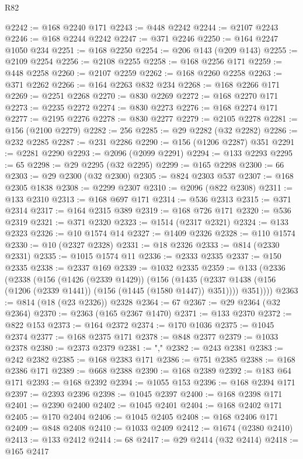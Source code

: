 \begin{lexlean}{R82}
\begin{coremodule}
@2242 := @168 @2240 @171
@2243 := @448 @2242
@2244 := @2107 @2243
@2246 := @168 @2244 @2242
@2247 := @371 @2246
@2250 := @164 @2247 @1050 @234
@2251 := @168 @2250
@2254 := @206 @143 (@209 @143)
@2255 := @2109 @2254
@2256 := @2108 @2255
@2258 := @168 @2256 @171
@2259 := @448 @2258
@2260 := @2107 @2259
@2262 := @168 @2260 @2258
@2263 := @371 @2262
@2266 := @164 @2263 @832 @234
@2268 := @168 @2266 @171
@2269 := @2251 @2268
@2270 := @830 @2269
@2272 := @168 @2270 @171
@2273 := @2235 @2272
@2274 := @830 @2273
@2276 := @168 @2274 @171
@2277 := @2195 @2276
@2278 := @830 @2277
@2279 := @2105 @2278
@2281 := @156 (@2100 @2279)
@2282 := 256
@2285 := @29 @2282 (@32 @2282)
@2286 := @232 @2285
@2287 := @231 @2286
@2290 := @156 (@1206 @2287) @351
@2291 := @2281 @2290
@2293 := @2096 (@2099 @2291)
@2294 := @133 @2293
@2295 := 65
@2298 := @29 @2295 (@32 @2295)
@2299 := @165 @2298
@2300 := 66
@2303 := @29 @2300 (@32 @2300)
@2305 := @824 @2303 @537
@2307 := @168 @2305 @1838
@2308 := @2299 @2307
@2310 := @2096 (@822 @2308)
@2311 := @133 @2310
@2313 := @168 @697 @171
@2314 := @536 @2313
@2315 := @371 @2314
@2317 := @164 @2315 @389
@2319 := @168 @726 @171
@2320 := @536 @2319
@2321 := @371 @2320
@2323 := @1514 (@2317 @2321)
@2324 := @133 @2323
@2326 := @10 @1574 @14
@2327 := @1409 @2326
@2328 := @110 @1574
@2330 := @10 (@2327 @2328)
@2331 := @18 @2326
@2333 := @814 (@2330 @2331)
@2335 := @1015 @1574 @11
@2336 := @2333 @2335
@2337 := @150 @2335
@2338 := @2337 @169
@2339 := @1032 @2335
@2359 := @133
    (@2336
      (@2338
        (@156
          (@1426 (@2339 @1429))
          (@156
            (@1435 (@2337 @1438 (@156 (@1206 (@2339 @1441)) (@156 (@1445 (@1580 @1447)) @351))))
            @351))))
@2363 := @814 (@18 (@23 @2326)) @2328
@2364 := 67
@2367 := @29 @2364 (@32 @2364)
@2370 := @2363 (@165 @2367 @1470)
@2371 := @133 @2370
@2372 := @822 @153
@2373 := @164 @2372
@2374 := @170 @1036
@2375 := @1045 @2374
@2377 := @168 @2375 @171
@2378 := @848 @2377
@2379 := @1033 @2378
@2380 := @2373 @2379
@2381 := ","
@2382 := @243 @2381
@2383 := @242 @2382
@2385 := @168 @2383 @171
@2386 := @751 @2385
@2388 := @168 @2386 @171
@2389 := @668 @2388
@2390 := @168 @2389
@2392 := @183 @64 @171
@2393 := @168 @2392
@2394 := @1055 @153
@2396 := @168 @2394 @171
@2397 := @2393 @2396
@2398 := @1045 @2397
@2400 := @168 @2398 @171
@2401 := @2390 @2400
@2402 := @1045 @2401
@2404 := @168 @2402 @171
@2405 := @170 @2404
@2406 := @1045 @2405
@2408 := @168 @2406 @171
@2409 := @848 @2408
@2410 := @1033 @2409
@2412 := @1674 (@2380 @2410)
@2413 := @133 @2412
@2414 := 68
@2417 := @29 @2414 (@32 @2414)
@2418 := @165 @2417

\end{coremodule}
\end{lexlean}
